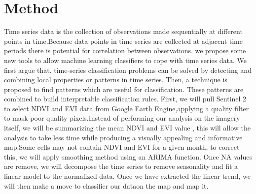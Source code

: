 \documentclass[
]{report}
\newenvironment{Shaded}{\begin{snugshade}}{\end{snugshade}}
\newcommand{\AttributeTok}[1]{\textcolor[rgb]{0.77,0.63,0.00}{#1}}
\newcommand{\CommentTok}[1]{\textcolor[rgb]{0.56,0.35,0.01}{\textit{#1}}}
\newcommand{\FunctionTok}[1]{\textcolor[rgb]{0.00,0.00,0.00}{#1}}
\newcommand{\NormalTok}[1]{#1}
\newcommand{\OtherTok}[1]{\textcolor[rgb]{0.56,0.35,0.01}{#1}}
\newcommand{\SpecialCharTok}[1]{\textcolor[rgb]{0.00,0.00,0.00}{#1}}
\newcommand{\StringTok}[1]{\textcolor[rgb]{0.31,0.60,0.02}{#1}}
\begin{document}
\hypertarget{method}{%
\section{Method}\label{method}}

Time series data is the collection of observations made sequentially at
different points in time.Because data points in time series are
collected at adjacent time periods there is potential for correlation
between observations. we propose some new tools to allow machine
learning classifiers to cope with time series data. We first argue that,
time-series classification problems can be solved by detecting and
combining local properties or patterns in time series. Then, a technique
is proposed to find patterns which are useful for classification. These
patterns are combined to build interpretable classification rules.
First, we will pull Sentinel 2 to select NDVI and EVI data from Google
Earth Engine,applying a quality filter to mask poor quality
pixels.Instead of performing our analysis on the imagery itself, we will
be summarizing the mean NDVI and EVI value , this will allow the
analysis to take less time while producing a visually appealing and
informative map.Some cells may not contain NDVI and EVI for a given
month, to correct this, we will apply smoothing method using an ARIMA
function. Once NA values are remove, we will decompose the time series
to remove seasonality and fit a linear model to the normalized data.
Once we have extracted the linear trend, we will then make a move to
classifier our dataon the map and map it.

\begin{Shaded}
\end{Shaded}
\end{document}
